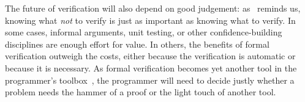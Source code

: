 The future of verification will also depend on good judgement: as~\cite{258848}
reminds us, knowing what \emph{not} to verify is just as important as knowing
what to verify. In some cases, informal arguments, unit testing, or other
confidence-building disciplines are enough effort for value. In others, the
benefits of formal verification outweigh the costs, either because the
verification is automatic or because it is necessary. As formal verification
becomes yet another tool in the programmer's toolbox~\cite{Brooks_1996}, the
programmer will need to decide justly whether a problem needs the hammer of a
proof or the light touch of another tool.
